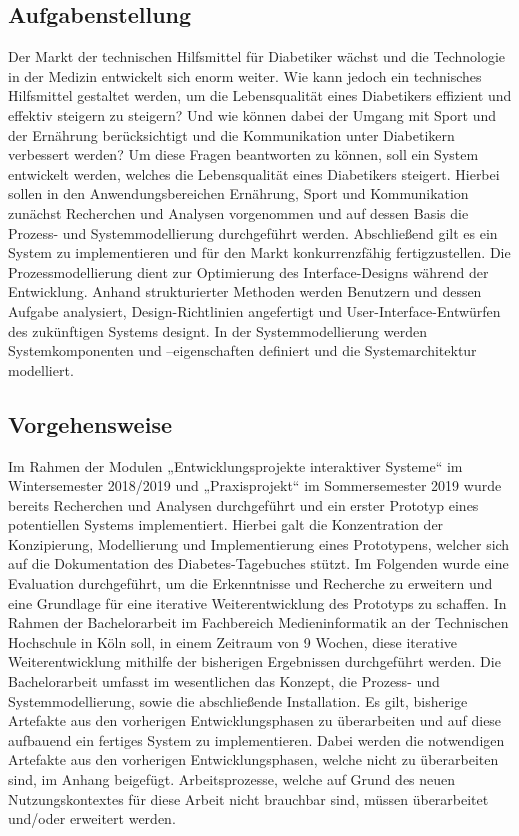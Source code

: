 \documentclass[a4paper,11pt]{article}%
\renewcommand{\\}{\vspace*{0.5\baselineskip} \newline}
\begin{document}
\subsection{Aufgabenstellung}
	Der Markt der technischen Hilfsmittel für Diabetiker wächst und die Technologie in der Medizin entwickelt sich enorm weiter. Wie kann jedoch ein technisches Hilfsmittel gestaltet werden, um die Lebensqualität eines Diabetikers effizient und effektiv steigern zu steigern? Und wie können dabei der Umgang mit Sport und der Ernährung berücksichtigt und die Kommunikation unter Diabetikern verbessert werden?\\
	Um diese Fragen beantworten zu können, soll ein System entwickelt werden, welches die Lebensqualität eines Diabetikers steigert. Hierbei sollen in den Anwendungsbereichen \glqq Ernährung\grqq{}, \glqq Sport\grqq{} und \glqq Kommunikation\grqq{} zunächst Recherchen und Analysen vorgenommen und auf dessen Basis die Prozess- und Systemmodellierung durchgeführt werden. Abschließend gilt es ein System zu implementieren und für den Markt konkurrenzfähig fertigzustellen. Die Prozessmodellierung dient zur Optimierung des Interface-Designs während der Entwicklung. Anhand strukturierter Methoden werden Benutzern und dessen Aufgabe analysiert, Design-Richtlinien angefertigt und User-Interface-Entwürfen des zukünftigen Systems designt. In der Systemmodellierung werden Systemkomponenten und –eigenschaften definiert und die Systemarchitektur modelliert.
\subsection{Vorgehensweise}
	Im Rahmen der Modulen „Entwicklungsprojekte interaktiver Systeme“ im Wintersemester 2018/2019 und „Praxisprojekt“ im Sommersemester 2019 wurde bereits Recherchen und Analysen durchgeführt und ein erster Prototyp eines potentiellen Systems implementiert. Hierbei galt die Konzentration der Konzipierung, Modellierung und Implementierung eines Prototypens, welcher sich auf die Dokumentation des Diabetes-Tagebuches stützt. Im Folgenden wurde eine Evaluation durchgeführt, um die Erkenntnisse und Recherche zu erweitern und eine Grundlage für eine iterative Weiterentwicklung des Prototyps zu schaffen. In Rahmen der Bachelorarbeit im Fachbereich Medieninformatik an der Technischen Hochschule in Köln soll, in einem Zeitraum von 9 Wochen, diese iterative Weiterentwicklung mithilfe der bisherigen Ergebnissen durchgeführt werden. \\
	Die Bachelorarbeit umfasst im wesentlichen das Konzept, die Prozess- und Systemmodellierung, sowie die abschließende Installation. Es gilt, bisherige Artefakte aus den vorherigen Entwicklungsphasen zu überarbeiten und auf diese aufbauend ein fertiges System zu implementieren. Dabei werden die notwendigen Artefakte aus den vorherigen Entwicklungsphasen, welche nicht zu überarbeiten sind, im Anhang beigefügt. Arbeitsprozesse, welche auf Grund des neuen Nutzungskontextes für diese Arbeit nicht brauchbar sind, müssen überarbeitet und/oder erweitert werden. 
\end{document}
